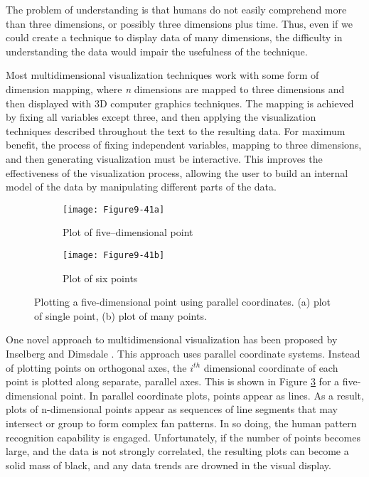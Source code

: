 The problem of understanding is that humans do not easily comprehend more than three dimensions, or possibly three dimensions plus time. Thus, even if we could create a technique to display data of many dimensions, the difficulty in understanding the data would impair the usefulness of the technique.

Most multidimensional visualization techniques work with some form of dimension mapping, where \emph{n} dimensions are mapped to three dimensions and then displayed with 3D computer graphics techniques. The mapping is achieved by fixing all variables except three, and then applying the visualization techniques described throughout the text to the resulting data. For maximum benefit, the process of fixing independent variables, mapping to three dimensions, and then generating visualization must be interactive. This improves the effectiveness of the visualization process, allowing the user to build an internal model of the data by manipulating different parts of the data.

\begin{figure}[htb]
	\begin{subfigure}[h]{0.48\linewidth}
		\texttt{[image: Figure9-41a]}
		\captionsetup{justification=centering}
		\caption{Plot of five--dimensional point}
		\label{fig:Figure9-41a}
	\end{subfigure}
	\hfill
	\begin{subfigure}[h]{0.48\linewidth}
		\texttt{[image: Figure9-41b]}
		\captionsetup{justification=centering}
		\caption{Plot of six points}
		\label{fig:Figure9-41b}
	\end{subfigure}
	\caption{Plotting a five-dimensional point using parallel coordinates. (a) plot of single point, (b) plot of many points.}\label{fig:Figure9-41}
\end{figure}

One novel approach to multidimensional visualization has been proposed by Inselberg and Dimsdale \cite{Inselberg87}. This approach uses parallel coordinate systems. Instead of plotting points on orthogonal axes, the $i^{th}$ dimensional coordinate of each point is plotted along separate, parallel axes. This is shown in Figure \ref{fig:Figure9-41} for a five-dimensional point. In parallel coordinate plots, points appear as lines. As a result, plots of n-dimensional points appear as sequences of line segments that may intersect or group to form complex fan patterns. In so doing, the human pattern recognition capability is engaged. Unfortunately, if the number of points becomes large, and the data is not strongly correlated, the resulting plots can become a solid mass of black, and any data trends are drowned in the visual display.

